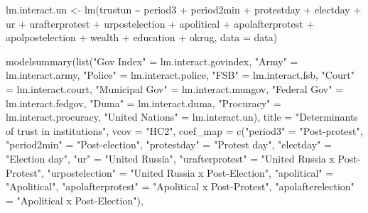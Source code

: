 \documentclass[
  letterpaper,
  DIV=11,
  numbers=noendperiod]{scrartcl}
\newenvironment{Shaded}{\begin{snugshade}}{\end{snugshade}}
\newcommand{\AttributeTok}[1]{\textcolor[rgb]{0.40,0.45,0.13}{#1}}
\newcommand{\FunctionTok}[1]{\textcolor[rgb]{0.28,0.35,0.67}{#1}}
\newcommand{\NormalTok}[1]{\textcolor[rgb]{0.00,0.23,0.31}{#1}}
\newcommand{\OtherTok}[1]{\textcolor[rgb]{0.00,0.23,0.31}{#1}}
\newcommand{\SpecialCharTok}[1]{\textcolor[rgb]{0.37,0.37,0.37}{#1}}
\newcommand{\StringTok}[1]{\textcolor[rgb]{0.13,0.47,0.30}{#1}}
\begin{document}
\begin{Shaded}
\begin{Highlighting}[]
\NormalTok{lm.interact.un }\OtherTok{\textless{}{-}} \FunctionTok{lm}\NormalTok{(trustun }\SpecialCharTok{\textasciitilde{}}\NormalTok{ period3 }\SpecialCharTok{+}\NormalTok{ period2min }\SpecialCharTok{+}\NormalTok{ protestday }\SpecialCharTok{+}\NormalTok{ electday }\SpecialCharTok{+} 
\NormalTok{                                ur }\SpecialCharTok{+}\NormalTok{ urafterprotest }\SpecialCharTok{+}\NormalTok{ urpostelection }\SpecialCharTok{+} 
\NormalTok{                                apolitical }\SpecialCharTok{+}\NormalTok{ apolafterprotest }\SpecialCharTok{+}\NormalTok{ apolpostelection }\SpecialCharTok{+}
\NormalTok{                                wealth }\SpecialCharTok{+}\NormalTok{ education }\SpecialCharTok{+}\NormalTok{ okrug, }\AttributeTok{data =}\NormalTok{ data)}

\FunctionTok{modelsummary}\NormalTok{(}\FunctionTok{list}\NormalTok{(}\StringTok{"Gov Index"} \OtherTok{=}\NormalTok{ lm.interact.govindex, }\StringTok{"Army"} \OtherTok{=}\NormalTok{ lm.interact.army, }\StringTok{"Police"} \OtherTok{=}\NormalTok{ lm.interact.police, }
                  \StringTok{"FSB"} \OtherTok{=}\NormalTok{ lm.interact.fsb, }\StringTok{"Court"} \OtherTok{=}\NormalTok{ lm.interact.court, }\StringTok{"Municipal Gov"} \OtherTok{=}\NormalTok{ lm.interact.mungov,}
                  \StringTok{"Federal Gov"} \OtherTok{=}\NormalTok{ lm.interact.fedgov, }\StringTok{"Duma"} \OtherTok{=}\NormalTok{ lm.interact.duma, }
                  \StringTok{"Procuracy"} \OtherTok{=}\NormalTok{ lm.interact.procuracy, }\StringTok{"United Nations"} \OtherTok{=}\NormalTok{ lm.interact.un),}
             \AttributeTok{title =} \StringTok{"Determinants of trust in institutions"}\NormalTok{,}
             \AttributeTok{vcov =} \StringTok{"HC2"}\NormalTok{,}
             \AttributeTok{coef\_map =} \FunctionTok{c}\NormalTok{(}\StringTok{"period3"} \OtherTok{=} \StringTok{"Post{-}protest"}\NormalTok{, }
             \StringTok{"period2min"} \OtherTok{=} \StringTok{"Post{-}election"}\NormalTok{, }\StringTok{"protestday"} \OtherTok{=} \StringTok{"Protest day"}\NormalTok{, }
             \StringTok{"electday"} \OtherTok{=} \StringTok{"Election day"}\NormalTok{, }\StringTok{"ur"} \OtherTok{=} \StringTok{"United Russia"}\NormalTok{, }\StringTok{"urafterprotest"} \OtherTok{=} \StringTok{"United Russia x Post{-}Protest"}\NormalTok{, }\StringTok{"urpostelection"} \OtherTok{=} \StringTok{"United Russia x Post{-}Election"}\NormalTok{, }\StringTok{"apolitical"} \OtherTok{=} \StringTok{"Apolitical"}\NormalTok{, }\StringTok{"apolafterprotest"} \OtherTok{=} \StringTok{"Apolitical x Post{-}Protest"}\NormalTok{, }\StringTok{"apolafterelection"} \OtherTok{=} \StringTok{"Apolitical x Post{-}Election"}\NormalTok{),}

\end{Highlighting}
\end{Shaded}
\end{document}
